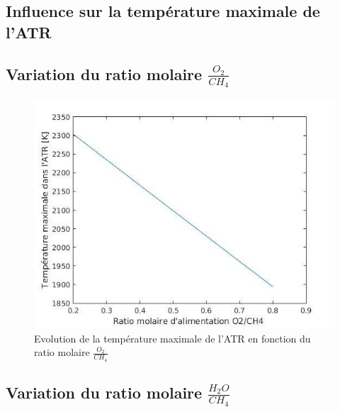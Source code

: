 \documentclass[12pt]{report}
\begin{document}
\textcolor{carmine}{\chapter{Influence sur la température maximale de l'ATR}}

\section{Variation du ratio molaire $\frac{O_2}{CH_4}$}



\begin{figure}[H]
\begin{center}
\includegraphics[scale=0.6]{Tmax_ratio_O2}
\caption{Evolution de la température maximale de l'ATR en fonction du ratio molaire $\frac{O_2}{CH_4}$}
\end{center}
\end{figure}


\section{Variation du ratio molaire $\frac{H_2O}{CH_4}$}
\end{document}
